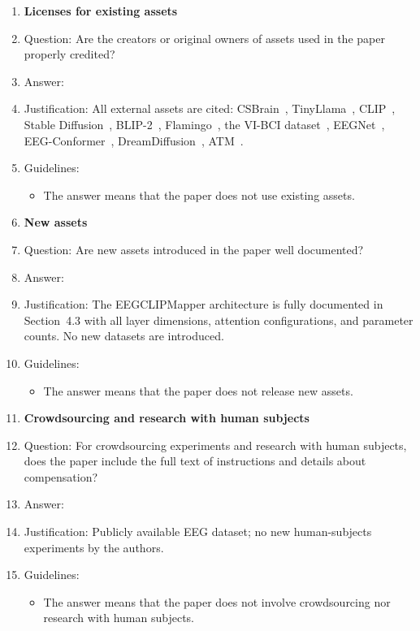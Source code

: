 \documentclass{article}
\begin{document}
\begin{enumerate}
\item {\bf Licenses for existing assets}
    \item[] Question: Are the creators or original owners of assets used in the paper properly credited?
    \item[] Answer: \answerYes{}
    \item[] Justification: All external assets are cited: CSBrain~\citep{zhu2024csbrain}, TinyLlama~\citep{zhang2024tinyllama}, CLIP~\citep{radford2021clip}, Stable Diffusion~\citep{rombach2022ldm}, BLIP-2~\citep{li2023blip2}, Flamingo~\citep{alayrac2022flamingo}, the VI-BCI dataset~\citep{figshare_eeg,figshare_paper}, EEGNet~\citep{lawhern2018eegnet}, EEG-Conformer~\citep{song2023eegconformer}, DreamDiffusion~\citep{bai2023dreamdiffusion}, ATM~\citep{li2024atm}.
    \item[] Guidelines:
    \begin{itemize}
        \item The answer \answerNA{} means that the paper does not use existing assets.
    \end{itemize}

\item {\bf New assets}
    \item[] Question: Are new assets introduced in the paper well documented?
    \item[] Answer: \answerYes{}
    \item[] Justification: The EEGCLIPMapper architecture is fully documented in Section~4.3 with all layer dimensions, attention configurations, and parameter counts. No new datasets are introduced.
    \item[] Guidelines:
    \begin{itemize}
        \item The answer \answerNA{} means that the paper does not release new assets.
    \end{itemize}

\item {\bf Crowdsourcing and research with human subjects}
    \item[] Question: For crowdsourcing experiments and research with human subjects, does the paper include the full text of instructions and details about compensation?
    \item[] Answer: \answerNA{}
    \item[] Justification: Publicly available EEG dataset; no new human-subjects experiments by the authors.
    \item[] Guidelines:
    \begin{itemize}
        \item The answer \answerNA{} means that the paper does not involve crowdsourcing nor research with human subjects.
    \end{itemize}


\end{enumerate}
\end{document}

